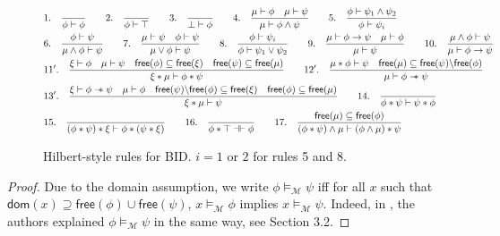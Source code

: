 \documentclass[conference,compsoc, 10pt]{IEEEtran}
\newcommand {\cM } {{\mathcal{M}}}
\newcommand {\Ldom }[1] {{\mathsf{dom}\!\left(#1\right)}}
\newcommand {\Lfree }[1] {{\mathsf{free}{\left(#1\right)}}}
\newcommand {\sepimp} {\mathrel{-\mkern-6mu*}}
\newcommand{\sd}{\diamond}%
\newcommand {\sdimp} {\mathrel{-\mkern-2.5mu\diamond}}
\newcommand{\qm}{{\ ?\ }}%
\newcommand {\qmimp} {\mathrel{-\mkern-6mu?}}
\begin{document}
\begin{appendices}
		\begin{figure}[h]
			\small
			\begin{align*}
			&1. \quad \frac{}{\phi\vdash\phi}  \qquad
			2. \quad \frac{}{\phi\vdash\top} \qquad 
			3. \quad \frac{}{\bot\vdash\phi} \qquad
			4. \quad \frac{\mu\vdash\phi\quad\mu\vdash\psi}{\mu\vdash\phi\wedge\psi} \qquad
			5. \quad \frac{\phi\vdash\psi_1\wedge\psi_2}{\phi\vdash\psi_i} \\	
			&6. \quad \frac{\phi\vdash\psi}{\mu\wedge\phi\vdash\psi} \qquad
			7. \quad \frac{\mu\vdash\psi\quad\phi\vdash\psi}{\mu\vee\phi\vdash\psi} \qquad
			8. \quad \frac{\phi\vdash\psi_i}{\phi\vdash\psi_1\vee\psi_2} \qquad
			9. \quad \frac{\mu\vdash\phi\rightarrow\psi\quad\mu\vdash\phi}{\mu\vdash\psi} \qquad
			10. \quad \frac{\mu\wedge\phi\vdash\psi}{\mu\vdash\phi\rightarrow\psi} \\ 
			&11^\prime. \quad \frac{\xi\vdash\phi\quad\mu\vdash\psi\quad \Lfree{\phi}\subseteq\Lfree{\xi}\quad\Lfree{\psi}\subseteq\Lfree{\mu}}{\xi\ast\mu\vdash\phi\ast\psi} \qquad
			12^\prime. \quad \frac{\mu\ast\phi\vdash\psi\quad \Lfree{\mu}\subseteq\Lfree{\psi}\backslash\Lfree{\phi}}{\mu\vdash\phi\sepimp\psi} \\
			&13^\prime. \quad \frac{\xi\vdash\phi\sepimp\psi\quad\mu\vdash\phi \quad \Lfree{\psi}\backslash\Lfree{\phi}\subseteq\Lfree{\xi}\quad \Lfree{\phi}\subseteq\Lfree{\mu} }{\xi\ast\mu\vdash\psi} \qquad
			14. \quad \frac{}{\phi\ast\psi\vdash\psi\ast\phi} \\
			&15. \quad \frac{}{(\phi\ast\psi)\ast\xi\vdash\phi\ast(\psi\ast\xi)} \qquad
			16. \quad \frac{}{\phi\ast\top\dashv\vdash\phi} \qquad
			17. \quad  \frac{\Lfree{\mu}\subseteq\Lfree{\phi}}{(\phi\ast\psi)\wedge\mu\vdash(\phi\wedge\mu)\ast\psi}
			\end{align*}
			\caption{Hilbert-style rules for BID. $i=1$ or $2$ for rules 5 and 8. 
			}
		\end{figure}
		
		\begin{proof}
			
			Due to the domain assumption, we write $\phi\models_\cM\psi$ iff for all $x$ such that $\Ldom{x}\supseteq\Lfree{\phi}\cup\Lfree{\psi}$, $x\models_\cM\phi$ implies $x\models_\cM\psi$. Indeed, in \cite{IO01}, the authors explained $\phi\models_\cM\psi$ in the same way, see Section 3.2.
			

\end{proof}
\end{appendices}
\end{document}
